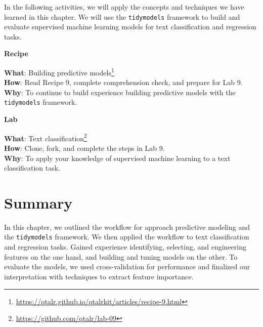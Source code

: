 \documentclass[
  letterpaper,
]{latex/krantz}
\theoremstyle{definition}
\theoremstyle{remark}
\DeclareRobustCommand{\href}[2]{#2\footnote{\url{#1}}}
\begin{document}

In the following activities, we will apply the concepts and techniques
we have learned in this chapter. We will use the \texttt{tidymodels}
framework to build and evaluate supervised machine learning models for
text classification and regression tasks.

\begin{tcolorbox}[enhanced jigsaw, toprule=.15mm, breakable, colback=white, opacityback=0, leftrule=.75mm, bottomrule=.15mm, colframe=quarto-callout-color-frame, left=2mm, arc=.35mm, rightrule=.15mm]

\textbf{ Recipe}

\textbf{What}:
\href{https://qtalr.github.io/qtalrkit/articles/recipe-9.html}{Building
predictive models}\\
\textbf{How}: Read Recipe 9, complete comprehension check, and prepare
for Lab 9.\\
\textbf{Why}: To continue to build experience building predictive models
with the \texttt{tidymodels} framework.

\end{tcolorbox}

\begin{tcolorbox}[enhanced jigsaw, toprule=.15mm, breakable, colback=white, opacityback=0, leftrule=.75mm, bottomrule=.15mm, colframe=quarto-callout-color-frame, left=2mm, arc=.35mm, rightrule=.15mm]

\textbf{ Lab}

\textbf{What}: \href{https://github.com/qtalr/lab-09}{Text
classification}\\
\textbf{How}: Clone, fork, and complete the steps in Lab 9.\\
\textbf{Why}: To apply your knowledge of supervised machine learning to
a text classification task.

\end{tcolorbox}

\section*{Summary}\label{summary-8}


In this chapter, we outlined the workflow for approach predictive
modeling and the \texttt{tidymodels} framework. We then applied the
workflow to text classification and regression tasks. Gained experience
identifying, selecting, and engineering features on the one hand, and
building and tuning models on the other. To evaluate the models, we used
cross-validation for performance and finalized our interpretation with
techniques to extract feature importance.
\end{document}
